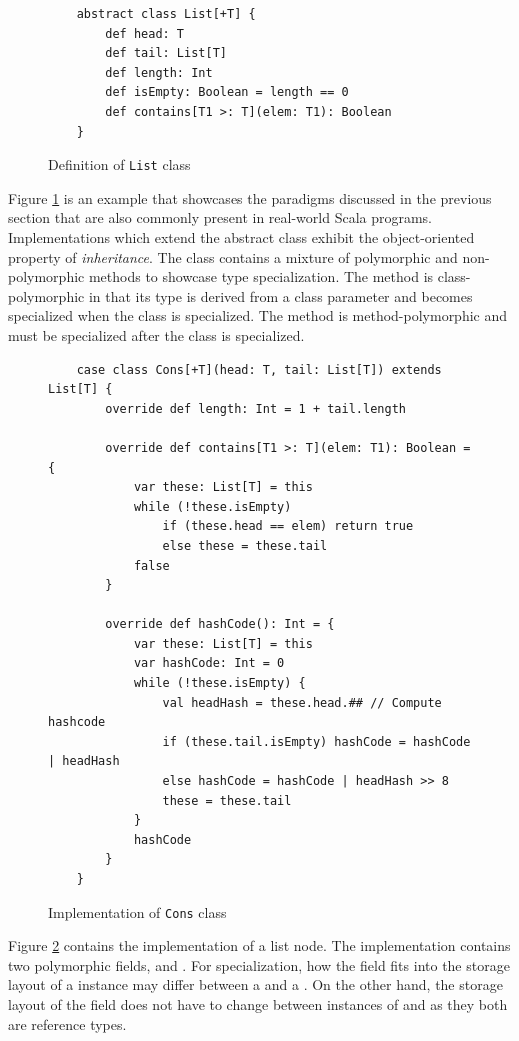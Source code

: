 \begin{figure}[!htb]
	\begin{verbatim}
	abstract class List[+T] {
		def head: T
		def tail: List[T]
		def length: Int
		def isEmpty: Boolean = length == 0
		def contains[T1 >: T](elem: T1): Boolean
	}
	\end{verbatim}
	\caption{Definition of \texttt{List} class}
	\label{example:list-def}
\end{figure}

Figure \ref{example:list-def} is an example that showcases the paradigms discussed in the previous section that are also commonly present in real-world Scala programs.
Implementations which extend the abstract  class exhibit the object-oriented property of \textit{inheritance}.
The  class contains a mixture of polymorphic and non-polymorphic methods to showcase type specialization.
The  method is class-polymorphic in that its type is derived from a class parameter and becomes specialized when the class is specialized.
The  method is method-polymorphic and must be specialized after the class is specialized.

\begin{figure}[!htb]
	\begin{verbatim}
	case class Cons[+T](head: T, tail: List[T]) extends List[T] {
		override def length: Int = 1 + tail.length
		
		override def contains[T1 >: T](elem: T1): Boolean = {
			var these: List[T] = this
			while (!these.isEmpty) 
				if (these.head == elem) return true
				else these = these.tail
			false
		}
			
		override def hashCode(): Int = {
			var these: List[T] = this
			var hashCode: Int = 0
			while (!these.isEmpty) {
				val headHash = these.head.## // Compute hashcode
				if (these.tail.isEmpty) hashCode = hashCode | headHash
				else hashCode = hashCode | headHash >> 8
				these = these.tail
			}
			hashCode
		}
	}
	\end{verbatim}
	\caption{Implementation of \texttt{Cons} class}
	\label{example:cons-impl}
\end{figure}

Figure \ref{example:cons-impl} contains the implementation of a list node.
The  implementation contains two polymorphic fields,  and .
For specialization, how the  field fits into the storage layout of a  instance may differ between a  and a .
On the other hand, the storage layout of the  field does not have to change between instances of  and  as they both are reference types.

